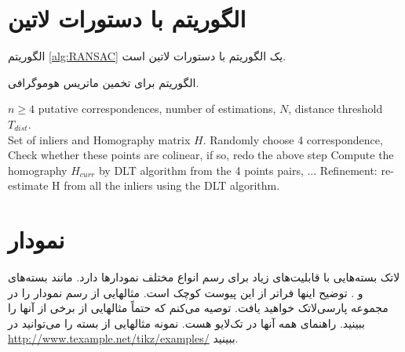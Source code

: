\section{الگوریتم با دستورات لاتین}
الگوریتم \ref{alg:RANSAC} یک الگوریتم با دستورات لاتین است.

\begin{algorithm}[ht]
\onehalfspacing
\caption{الگوریتم  برای تخمین ماتریس هوموگرافی.} \label{alg:RANSAC}
\begin{latin}
\begin{algorithmic}[1]
\REQUIRE $n\geq4$ putative correspondences, number of estimations, $N$, distance threshold $T_{dist}$.\\
\ENSURE Set of inliers and Homography matrix $H$.
  \STATE Randomly choose 4 correspondence,
  \STATE Check whether these points are colinear, if so, redo the above step
  \STATE Compute the homography $H_{curr}$ by DLT algorithm from the 4 points pairs,
  \STATE $\ldots$ %
  \ENDFOR
  \STATE Refinement: re-estimate H from all the inliers using the DLT algorithm.
\end{algorithmic}
\end{latin}
\end{algorithm}

\section{نمودار}
لاتک بسته‌هایی با قابلیت‌های زیاد برای رسم انواع مختلف نمودارها دارد. مانند بسته‌های  و  . توضیح اینها فراتر از این پیوست کوچک است. مثالهایی از رسم نمودار را در مجموعه پارسی‌لاتک خواهید یافت. توصیه می‌کنم که حتماً مثالهایی از برخی از آنها را ببینید. راهنمای همه آنها در تک‌لایو هست. نمونه مثالهایی از بسته  را می‌توانید در \url{http://www.texample.net/tikz/examples/} ببینید.


